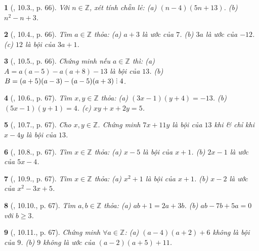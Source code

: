 \documentclass{article}
\newtheorem{baitoan}{}
\DeclareRobustCommand{\divby}{%
	\mathrel{\vbox{\baselineskip.65ex\lineskiplimit0pt\hbox{.}\hbox{.}\hbox{.}}}%
}
\begin{document}
\begin{baitoan}[\cite{Binh_boi_duong_Toan_6_tap_1}, 10.3., p. 66]
	Với $n\in\mathbb{Z}$, xét tính chẵn lẻ: (a) $(n - 4)(5n + 13)$. (b) $n^2 - n + 3$.
\end{baitoan}

\begin{baitoan}[\cite{Binh_boi_duong_Toan_6_tap_1}, 10.4., p. 66]
	Tìm $a\in\mathbb{Z}$ thỏa: (a) $a + 3$ là ước của $7$. (b) $3a$ là ước của $-12$. (c) $12$ là bội của $3a + 1$.
\end{baitoan}

\begin{baitoan}[\cite{Binh_boi_duong_Toan_6_tap_1}, 10.5., p. 66]
	Chứng minh nếu $a\in\mathbb{Z}$ thì: (a) $A = a(a - 5) - a(a + 8) - 13$ là bội của $13$. (b) $B = (a + 5)(a - 3) - (a - 5)(a + 3)\divby4$.
\end{baitoan}

\begin{baitoan}[\cite{Binh_boi_duong_Toan_6_tap_1}, 10.6., p. 67]
	Tìm $x,y\in\mathbb{Z}$ thỏa: (a) $(3x - 1)(y + 4) = -13$. (b) $(5x - 1)(y + 1) = 4$. (c) $xy + x + 2y = 5$.
\end{baitoan}

\begin{baitoan}[\cite{Binh_boi_duong_Toan_6_tap_1}, 10.7., p. 67]
	Cho $x,y\in\mathbb{Z}$. Chứng minh $7x + 11y$ là bội của $13$ khi \& chỉ khi $x - 4y$ là bội của $13$.
\end{baitoan}

\begin{baitoan}[\cite{Binh_boi_duong_Toan_6_tap_1}, 10.8., p. 67]
	Tìm $x\in\mathbb{Z}$ thỏa: (a) $x - 5$ là bội của $x + 1$. (b) $2x - 1$ là ước của $5x - 4$.
\end{baitoan}

\begin{baitoan}[\cite{Binh_boi_duong_Toan_6_tap_1}, 10.9., p. 67]
	Tìm $x\in\mathbb{Z}$ thỏa: (a) $x^2 + 1$ là bội của $x + 1$. (b) $x - 2$ là ước của $x^2 - 3x + 5$.
\end{baitoan}

\begin{baitoan}[\cite{Binh_boi_duong_Toan_6_tap_1}, 10.10., p. 67]
	Tìm $a,b\in\mathbb{Z}$ thỏa: (a) $ab + 1 = 2a + 3b$. (b) $ab - 7b + 5a = 0$ với $b\ge3$.
\end{baitoan}

\begin{baitoan}[\cite{Binh_boi_duong_Toan_6_tap_1}, 10.11., p. 67]
	Chứng minh $\forall a\in\mathbb{Z}$: (a) $(a - 4)(a + 2) + 6$ không là bội của $9$. (b) $9$ không là ước của $(a - 2)(a + 5) + 11$.
\end{baitoan}
\end{document}
